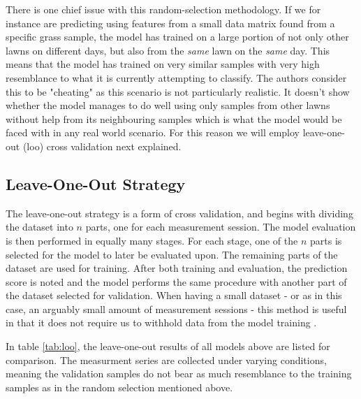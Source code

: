 There is one chief issue with this random-selection methodology. If we for instance are predicting using features from a small data matrix found from a specific grass sample, the model has trained on a large portion of not only other lawns on different days, but also from the \emph{same} lawn on the \emph{same} day. This means that the model has trained on very similar samples with very high resemblance to what it is currently attempting to classify. The authors consider this to be "cheating" as this scenario is not particularly realistic. It doesn't show whether the model manages to do well using only samples from other lawns without help from its neighbouring samples which is what the model would be faced with in any real world scenario. For this reason we will employ leave-one-out (\gls{loo}) cross validation next explained. 





\subsection{Leave-One-Out Strategy}

The leave-one-out strategy is a form of cross validation, and begins with dividing the dataset into $n$ parts, one for each measurement session. The model evaluation is then performed in equally many stages. For each stage, one of the $n$ parts is selected for the model to later be evaluated upon. The remaining parts of the dataset are used for training. After both training and evaluation, the prediction score is noted and the model performs the same procedure with another part of the dataset selected for validation. When having a small dataset - or as in this case, an arguably small amount of measurement sessions - this method is useful in that it does not require us to withhold data from the model training \citep{raschka}.

In table \ref{tab:loo}, the leave-one-out results of all models above are listed for comparison. The measurment series are collected under varying conditions, meaning the validation samples do not bear as much resemblance to the training samples as in the random selection mentioned above.

